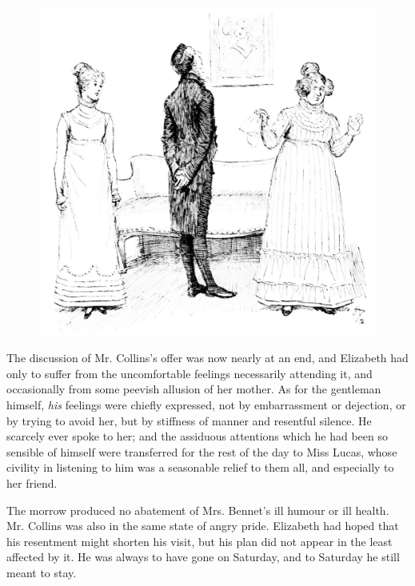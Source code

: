 \begin{figure}[htbp]
    \centering
    \includegraphics[width=\textwidth]{illustrations/i_175_a.jpg}
\end{figure}


The discussion of Mr. Collins's offer was now nearly at an end, and Elizabeth had only to suffer from the uncomfortable feelings necessarily attending it, and occasionally from some peevish allusion of her mother. As for the gentleman himself, \textit{his} feelings were chiefly expressed, not by embarrassment or dejection, or by trying to avoid her, but by stiffness of manner and resentful silence. He scarcely ever spoke to her; and the assiduous attentions which he had been so sensible of himself were transferred for the rest of the day to Miss Lucas, whose civility in listening to him was a seasonable relief to them all, and especially to her friend.

The morrow produced no abatement of Mrs. Bennet's ill humour or ill health. Mr. Collins was also in the same state of angry pride. Elizabeth had hoped that his resentment might shorten his visit, but his plan did not appear in the least affected by it. He was always to have gone on Saturday, and to Saturday he still meant to stay.

